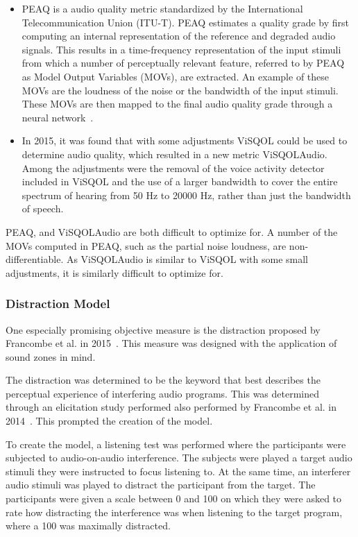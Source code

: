 \begin{itemize}
    \item 
PEAQ is a audio quality metric standardized by the International Telecommunication Union (ITU-T).
PEAQ estimates a quality grade by first computing an internal representation  of
the reference and degraded audio signals.
This results in a time-frequency representation of the input stimuli from which a number of perceptually relevant feature,
referred to by PEAQ as Model Output Variables (MOVs), are extracted.
An example of these MOVs are the loudness of the noise or the bandwidth of the input stimuli.
These MOVs are then mapped to the final audio quality grade through a neural network~\cite{thiede2000peaq}.
    \item 
In 2015, it was found that with some adjustments ViSQOL could be used to determine audio quality, which resulted in a 
new metric ViSQOLAudio.
Among the adjustments were the removal of the voice activity detector included in ViSQOL and the use of a larger bandwidth
to cover the entire spectrum of hearing from 50 Hz to 20000 Hz, rather than just the bandwidth of speech.
\end{itemize}

PEAQ, and ViSQOLAudio are both difficult to optimize for.
A number of the MOVs computed in PEAQ, such as the partial noise loudness, are non-differentiable.
As ViSQOLAudio is similar to ViSQOL with some small adjustments, it is similarly difficult to optimize for.

\subsubsection{Distraction Model}
One especially promising objective measure is the distraction proposed by Francombe et al. in 2015~\cite{francombe2015model}.
This measure was designed with the application of sound zones in mind.

The distraction was determined to be the keyword that best describes the perceptual experience of 
interfering audio programs.
This was determined through an elicitation study performed also performed by Francombe et al. 
in 2014~\cite{francombe2014elicitation}.
This prompted the creation of the model.

To create the model, a listening test was performed where the participants were subjected to audio-on-audio interference.
The subjects were played a target audio stimuli they were instructed to focus listening to.
At the same time, an interferer audio stimuli was played to distract the participant from the target.
The participants were given a scale between 0 and 100 on which they were asked to rate how distracting the interference
was when listening to the target program, where a 100 was maximally distracted.

